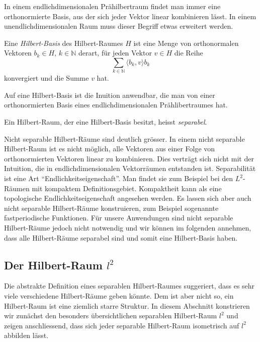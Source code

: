 In einem endlichdimensionalen Prähilbertraum findet man immer eine
orthonormierte Basis, aus der sich jeder Vektor linear kombinieren
lässt.
In einem unendlichdimensionalen Raum muss dieser Begriff etwas 
erweitert werden.

\begin{definition}
Eine {\em Hilbert-Basis} des Hilbert-Raumes $H$ ist eine Menge von orthonormalen
%
Vektoren $b_k\in H$, $k\in \mathbb{N}$ derart, für jeden Vektor $v\in H$
die Reihe 
\[
\sum_{k\in\mathbb{N}} \langle b_k,v\rangle b_k
\]
konvergiert und die Summe $v$ hat.
\end{definition}

Auf eine Hilbert-Basis ist die Inuition anwendbar, die man von 
einer orthonormierten Basis eines endlichdimensionalen Prählibertraumes
hat.

\begin{definition}
%
Ein Hilbert-Raum, der eine Hilbert-Basis besitzt, heisst {\em separabel}.
\end{definition}

Nicht separable Hilbert-Räume sind deutlich grösser.
In einem nicht separable Hilbert-Raum ist es nicht möglich, alle Vektoren
aus einer Folge von orthonormierten Vektoren linear zu kombinieren.
Dies verträgt sich nicht mit der Intuition, die in endlichdimensionalen
Vektorräumen entstanden ist.
Separabilität ist eine Art ``Endlichkeitseigenschaft''.
Man findet sie zum Beispiel bei den $L^2$-Räumen mit kompaktem
Definitionsgebiet.
Kompaktheit kann als eine topologische
Endlichkeitseigenschaft angesehen werden.
Es lassen sich aber auch nicht separable Hilbert-Räume konstruieren,
zum Beispiel sogenannte fastperiodische Funktionen.
%
Für unsere Anwendungen sind nicht separable Hilbert-Räume jedoch nicht
notwendig und wir können im folgenden annehmen, dass alle Hilbert-Räume
separabel sind und somit eine Hilbert-Basis haben.

%
%
\subsection{Der Hilbert-Raum $l^2$}
Die abstrakte Definition eines separablen Hilbert-Raumes suggeriert,
dass es sehr viele verschiedene Hilbert-Räume geben könnte.
Dem ist aber nicht so, ein Hilbert-Raum ist eine ziemlich starre Struktur.
In diesem Abschnitt konstrieren wir zunächst den besonders übersichtlichen
separablen Hilbert-Raum $l^2$ und zeigen anschliessend, dass sich jeder
separable Hilbert-Raum isometrisch auf $l^2$ abbilden lässt.

